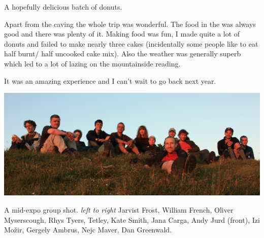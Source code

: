 \begin{marginfigure}
\checkoddpage \ifoddpage \forcerectofloat \else \forceversofloat \fi
\centering
 \caption{A hopefully delicious batch of donuts. }
 \label{donuts}
\end{marginfigure}


Apart from the caving the whole trip was wonderful. The food in the  was always good and there was plenty of it. Making food was fun, I made quite a lot of donuts and failed to make nearly three cakes (incidentally some people like to eat half burnt/ half uncooked cake mix). Also the weather was generally superb which led to a lot of lazing on the mountainside reading.

It was an amazing experience and I can’t wait to go back next year.

\begin{pagefigure}
\checkoddpage \ifoddpage \forcerectofloat \else \forceversofloat \fi
   \centering
\includegraphics[width = \textwidth]{2012/alex_pitcher/rhys/2012-08-01-1123-GergelyAmbrus-IMG_2146--orig.jpg}
\caption{A mid-expo group shot. \textit{left to right} Jarvist Frost, William French, Oliver Myserscough, Rhys Tyers, Tetley, Kate Smith, Jana Carga, Andy Jurd (front), Izi Možir, Gergely Ambrus, Nejc Maver, Dan Greenwald. } \label{group sunset 2012}
\end{pagefigure}